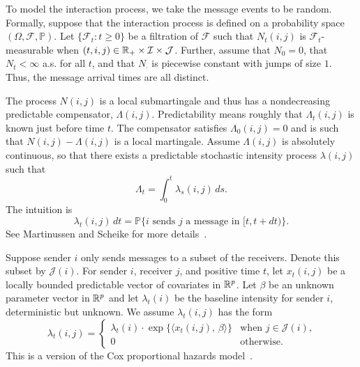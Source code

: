 \documentclass[aoas,preprint]{imsart}
\begin{document}

To model the interaction process, we take the message events to be random.
Formally, suppose that the interaction process is defined on a
probability space $(\Omega, \mathcal{F}, \mathbb{P})$.  Let
$\big\{ \mathcal{F}_t : t \geq 0 \big\}$ be a filtration of $\mathcal{F}$
such that $N_t(i,j)$ is $\mathcal{F}_t$-measurable when
$(t,i,j) \in \mathbb{R}_+ \times \mathcal{I} \times \mathcal{J}$.  Further,
assume that $N_0 = 0$, that $N_t < \infty$ a.s. for all $t$, and that 
$N_\cdot$ is piecewise constant with jumps of size $1$.  Thus, the message
arrival times are all distinct.

The process $N(i,j)$ is a local submartingale and thus has a 
nondecreasing predictable compensator, $\Lambda(i,j)$.  Predictability
means roughly that $\Lambda_t(i,j)$ is known just before time $t$.  The
compensator satisfies $\Lambda_0(i,j) = 0$ and is such that
\(
    N(i,j) - \Lambda(i,j)
\)
is a local martingale.  Assume $\Lambda(i,j)$ is absolutely continuous,
so that there exists a predictable stochastic intensity process $\lambda(i,j)$
such that
\[
    \Lambda_t = \int_0^t \lambda_s(i,j) \, ds.
\]
The intuition is
\[
    \lambda_t(i,j) \, dt
        =
        \mathbb{P}\{
            \text{$i$ sends $j$ a message in $[t,t+dt)$}
        \}.
\]
See Martinussen and Scheike for more details~\cite{martinussen2006dynamic}.

Suppose sender $i$ only sends messages to a subset of the receivers.  Denote
this subset by $\mathcal{J}(i)$.  For sender $i$, receiver $j$, and positive
time $t$, let $x_t(i,j)$ be a locally bounded predictable vector of
covariates in $\mathbb{R}^p$.  Let $\beta$ be an unknown parameter vector in
$\mathbb{R}^p$ and let $\lambda_t(i)$ be the baseline intensity for sender $i$,
deterministic but unknown.  We assume $\lambda_t(i,j)$ has the form
\begin{equation}
    \lambda_t(i,j)
        = 
        \begin{cases}
            \lambda_t(i)
            \cdot
            \exp\{ \langle x_t(i,j), \, \beta \rangle \}
                &\text{when $j \in \mathcal{J}(i)$,} \\
            0
                &\text{otherwise.}
        \end{cases}
\end{equation}
This is a version of the Cox proportional hazards
model~\cite{cox1972regression}.
\end{document}
